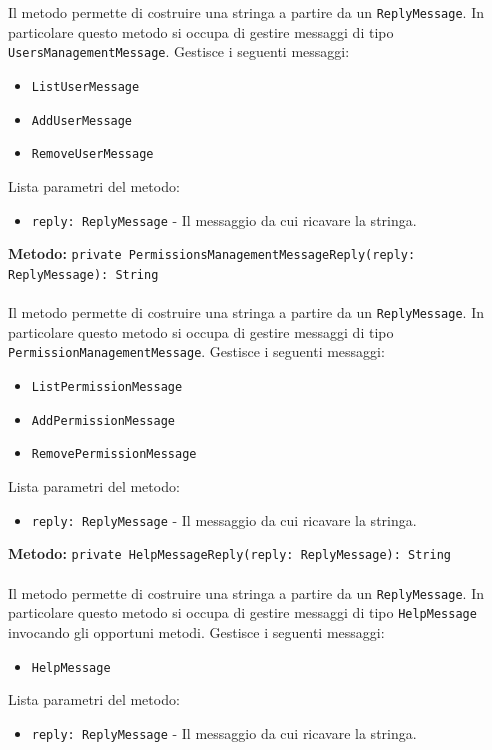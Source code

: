 \documentclass[a4paper]{article}
\begin{document}
			\\ \\
			Il metodo permette di costruire una stringa a partire da un \texttt{ReplyMessage}. In particolare questo metodo si occupa di gestire messaggi di tipo \texttt{UsersManagementMessage}.
			Gestisce i seguenti messaggi:
			\begin{itemize}
				\item \texttt{ListUserMessage}
				\item \texttt{AddUserMessage}
				\item \texttt{RemoveUserMessage}
			\end{itemize}
			Lista parametri del metodo:
			\begin{itemize}
				\item \texttt{reply: ReplyMessage} - Il messaggio da cui ricavare la stringa.
			\end{itemize}
		\textbf{Metodo: }\texttt{private PermissionsManagementMessageReply(reply: ReplyMessage): String}
			\\ \\
			Il metodo permette di costruire una stringa a partire da un \texttt{ReplyMessage}. In particolare questo metodo si occupa di gestire messaggi di tipo \texttt{PermissionManagementMessage}.
			Gestisce i seguenti messaggi:
			\begin{itemize}
				\item \texttt{ListPermissionMessage}
				\item \texttt{AddPermissionMessage}
				\item \texttt{RemovePermissionMessage}
			\end{itemize}
			Lista parametri del metodo:
			\begin{itemize}
				\item \texttt{reply: ReplyMessage} - Il messaggio da cui ricavare la stringa.
			\end{itemize}
		\textbf{Metodo: }\texttt{private HelpMessageReply(reply: ReplyMessage): String}
			\\ \\
			Il metodo permette di costruire una stringa a partire da un \texttt{ReplyMessage}. In particolare questo metodo si occupa di gestire messaggi di tipo \texttt{HelpMessage} invocando gli opportuni metodi.
			Gestisce i seguenti messaggi:
			\begin{itemize}
				\item \texttt{HelpMessage}
			\end{itemize}
			Lista parametri del metodo:
			\begin{itemize}
				\item \texttt{reply: ReplyMessage} - Il messaggio da cui ricavare la stringa.
			\end{itemize}
\end{document}
